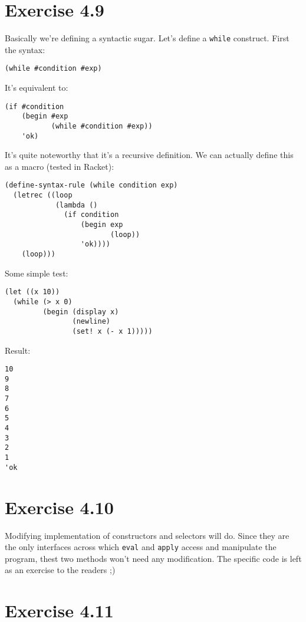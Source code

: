 \documentclass[../main.tex]{subfiles}
\begin{document}
\section{Exercise 4.9}

Basically we're defining a syntactic sugar. Let's define a
\lstinline{while} construct. First the syntax:

\begin{lstlisting}
(while #condition #exp)
\end{lstlisting}

It's equivalent to:

\begin{lstlisting}
(if #condition
    (begin #exp
           (while #condition #exp))
    'ok)
\end{lstlisting}

It's quite noteworthy that it's a recursive definition. We
can actually define this as a macro (tested in Racket):

\begin{lstlisting}
(define-syntax-rule (while condition exp)
  (letrec ((loop
            (lambda ()
              (if condition
                  (begin exp
                         (loop))
                  'ok))))
    (loop)))
\end{lstlisting}

Some simple test:

\begin{lstlisting}
(let ((x 10))
  (while (> x 0)
         (begin (display x)
                (newline)
                (set! x (- x 1)))))
\end{lstlisting}

Result:

\begin{lstlisting}
10
9
8
7
6
5
4
3
2
1
'ok
\end{lstlisting}

\section{Exercise 4.10}

Modifying implementation of constructors and selectors will do.
Since they are the only interfaces across which \lstinline{eval}
and \lstinline{apply} access and manipulate the program, thest two
methods won't need any modification. The specific code is left as
an exercise to the readers ;)

\section{Exercise 4.11}
\end{document}
